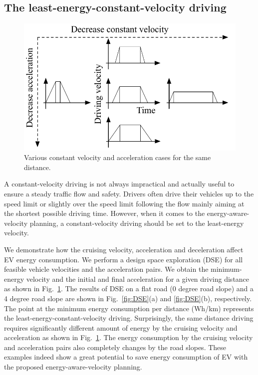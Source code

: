 \documentclass{IEEEtran}
\begin{document}
\subsection{The least-energy-constant-velocity driving} \label{subsec:constant drive}

\begin{figure} %
\centering
\includegraphics[width=0.85\hsize]{Figures/const_vel_drive_problem.pdf}
\caption{Various constant velocity and acceleration cases for the same distance.}
\label{fig:const_vel_drive_problem}
\end{figure} 

A constant-velocity driving is not always impractical and actually  useful to ensure a steady traffic flow and safety. Drivers often drive their vehicles up to the speed limit or slightly over the speed limit following the flow mainly aiming at the shortest possible driving time. However, when it comes to the energy-aware-velocity planning, a constant-velocity driving should be set to the least-energy velocity. 

We demonstrate how the cruising velocity, acceleration and deceleration affect EV energy consumption. We perform a design space exploration (DSE) for all feasible vehicle velocities and the acceleration pairs. We obtain the minimum-energy velocity and the initial and final acceleration for a given driving distance  as shown in Fig.~\ref{fig:const_vel_drive_problem}. The results of DSE on a flat road (0 degree road slope) and a 4 degree road slope are shown in Fig.~\ref{fig:DSE}(a) and \ref{fig:DSE}(b), respectively. The point at the minimum energy consumption per distance (Wh/km) represents the least-energy-constant-velocity driving. Surprisingly, the same distance driving requires significantly different amount of energy by the cruising velocity and acceleration as shown in Fig.~\ref{fig:const_vel_drive_problem}. The energy consumption by the cruising velocity and acceleration pairs also completely changes by the road slopes. These examples indeed show a great potential to save energy consumption of EV with the proposed energy-aware-velocity planning.
\end{document}
